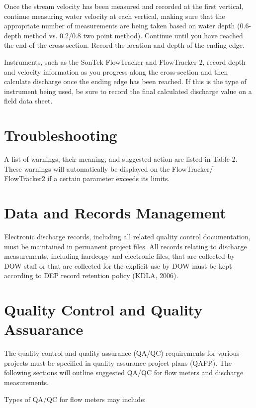 \documentclass[12pt]{../SOP3_beta}\usepackage[]{graphicx}\usepackage[]{xcolor}
\begin{document}
\NP Once the stream velocity has been measured and recorded at the first vertical, continue
measuring water velocity at each vertical, making sure that the appropriate number of
measurements are being taken based on water depth (0.6-depth method vs. 0.2/0.8
two point method). Continue until you have reached the end of the cross-section.
Record the location and depth of the ending edge.

\NP Instruments, such as the SonTek FlowTracker and FlowTracker 2, record depth and
velocity information as you progress along the cross-section and then calculate
discharge once the ending edge has been reached. If this is the type of instrument
being used, be sure to record the final calculated discharge value on a field data sheet.

\section{Troubleshooting}

A list of warnings, their meaning, and suggested action are listed in Table 2. These
warnings will automatically be displayed on the FlowTracker/ FlowTracker2 if a certain
parameter exceeds its limits.

\section{Data and Records Management}

Electronic discharge records, including all related quality control documentation, must
be maintained in permanent project files. All records relating to discharge
measurements, including hardcopy and electronic files, that are collected by DOW staff
or that are collected for the explicit use by DOW must be kept according to DEP record
retention policy (KDLA, 2006).

\section{Quality Control and Quality Assuarance}

\NP The quality control and quality assurance (QA/QC) requirements for various projects
must be specified in quality assurance project plans (QAPP). The following sections will
outline suggested QA/QC for flow meters and discharge measurements.

\NP Types of QA/QC for flow meters may include:
\end{document}
